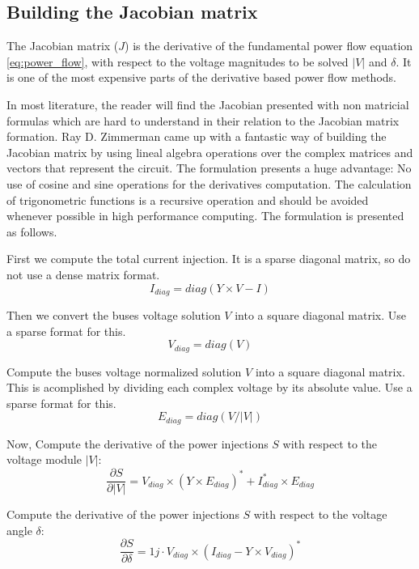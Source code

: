 \documentclass{tufte-book}
\begin{document}
\subsection{Building the Jacobian matrix} \label{Jacobian_chapter}

The Jacobian matrix ($J$) is the derivative of the fundamental power flow equation \ref{eq:power_flow}, with respect to the voltage magnitudes to be solved $|V|$ and $\delta$. It is one of the most expensive parts of the derivative based power flow methods.

In most literature, the reader will find the Jacobian presented with non matricial formulas which are hard to understand in their relation to the Jacobian matrix formation. Ray D. Zimmerman came up with a fantastic way of building the Jacobian matrix \cite{zimmerman2010ac} by using lineal algebra operations over the complex matrices and vectors that represent the circuit. The formulation presents a huge advantage: No use of cosine and sine operations for the derivatives computation. The calculation of trigonometric functions is a recursive operation and should be avoided whenever possible in high performance computing. The formulation is presented as follows.

First we compute the total current injection. It is a sparse diagonal matrix, so do not use a dense matrix format.
\begin{equation}
I_{diag} = diag(Y \times V - I)
\end{equation}

Then we convert the buses voltage solution $V$ into a square diagonal matrix. Use a sparse format for this.
\begin{equation}
V_{diag} = diag(V)
\end{equation}

Compute the buses voltage normalized solution $V$ into a square diagonal matrix. This is acomplished by dividing each complex voltage by its absolute value. Use a sparse format for this.
\begin{equation}
E_{diag} = diag(V / |V|)
\end{equation}

Now, Compute the derivative of the power injections $S$ with respect to the voltage module $|V|$:
\begin{equation}
\frac{\partial S}{\partial |V|} = V_{diag} \times (Y \times E_{diag})^* + I_{diag}^* \times  E_{diag}
\end{equation}
    
Compute the derivative of the power injections $S$ with respect to the voltage angle $\delta$:
\begin{equation}
\frac{\partial S}{\partial \delta} = 1j \cdot V_{diag} \times (I_{diag} - Y \times V_{diag})^*
\end{equation}
\end{document}
